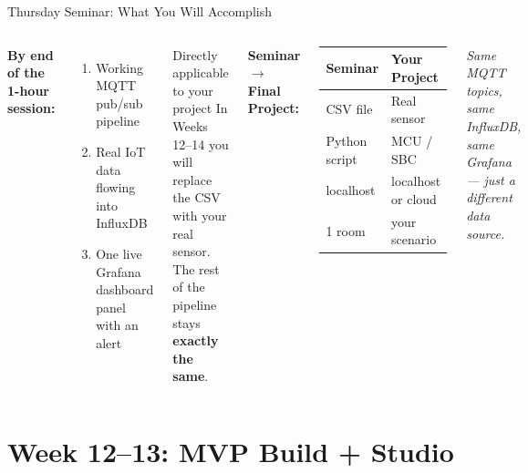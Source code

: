 \documentclass[aspectratio=169,11pt]{beamer}
\begin{document}
\begin{frame}{Thursday Seminar: What You Will Accomplish}
    \begin{columns}
        \textbf{By end of the 1-hour session:}
        \begin{enumerate}
            \item Working MQTT pub/sub pipeline
            \item Real IoT data flowing into InfluxDB
            \item One live Grafana dashboard panel with an alert
        \end{enumerate}

        \vspace{0.3cm}
        \begin{alertblock}{Directly applicable to your project}
            In Weeks 12--14 you will replace the CSV with your real sensor.\\
            The rest of the pipeline stays \textbf{exactly the same}.
        \end{alertblock}

        \textbf{Seminar $\rightarrow$ Final Project:}

        \vspace{0.2cm}
        \begin{center}
        \footnotesize
        \begin{tabular}{ll}
            \toprule
            \textbf{Seminar} & \textbf{Your Project} \\
            \midrule
            CSV file & Real sensor \\
            Python script & MCU / SBC \\
            localhost & localhost or cloud \\
            1 room & your scenario \\
            \bottomrule
        \end{tabular}
        \end{center}

        \vspace{0.2cm}
        \textit{Same MQTT topics, same InfluxDB, same Grafana --- just a different data source.}
    \end{columns}
\end{frame}

\section{Week 12--13: MVP Build + Studio}
\end{document}

